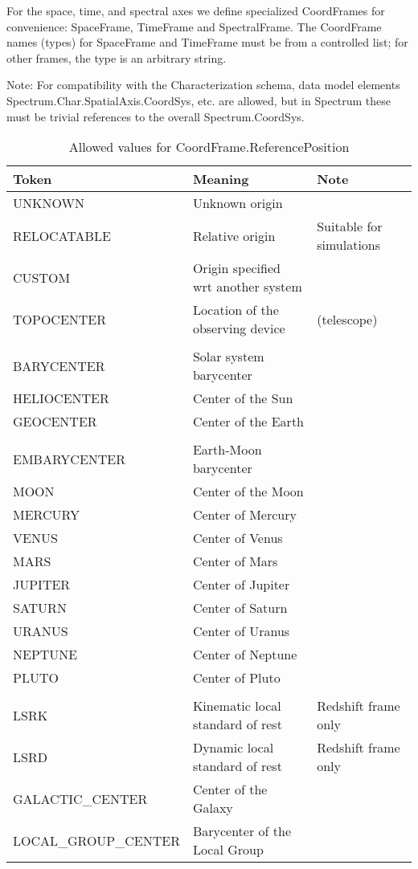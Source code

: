 \documentclass[11pt]{article}
\begin{document}
For the space, time, and spectral axes we define specialized CoordFrames
for convenience: SpaceFrame, TimeFrame and SpectralFrame. The
CoordFrame names (types) for SpaceFrame and TimeFrame must be from a
controlled list; for other frames, the type is an arbitrary string.

Note: For compatibility with the Characterization schema, data model
elements Spectrum.Char.SpatialAxis.CoordSys, etc. are allowed, but
in Spectrum these must be trivial references to the overall
Spectrum.CoordSys.


\setcounter{table}{3}

\begin{table}[h]
\small

\begin{tabular}{|lll|}
\hline
Token  &  Meaning & Note \\
\hline
UNKNOWN     &  Unknown origin&\\   %
RELOCATABLE & Relative origin& Suitable for simulations\\
CUSTOM      &  Origin specified wrt another system&\\
TOPOCENTER &  Location of the observing device &(telescope)\\
&&\\
BARYCENTER &  Solar system barycenter&\\
HELIOCENTER &  Center of the Sun&\\
GEOCENTER   &  Center of the Earth&\\
&&\\
EMBARYCENTER & Earth-Moon barycenter&\\
MOON         & Center of the Moon&\\
MERCURY      & Center of Mercury&\\
VENUS        & Center of Venus &\\
MARS & Center of Mars&\\
JUPITER& Center of Jupiter&\\
SATURN & Center of Saturn&\\
URANUS & Center of Uranus&\\
NEPTUNE & Center of Neptune&\\
PLUTO   & Center of Pluto&\\
&&\\
LSRK        & Kinematic local standard of rest& Redshift frame only\\
LSRD        & Dynamic local standard of rest& Redshift frame only\\
GALACTIC\_CENTER& Center of the Galaxy&\\
LOCAL\_GROUP\_CENTER&  Barycenter of the Local Group&\\
\hline
\end{tabular}
\caption{Allowed values for CoordFrame.ReferencePosition}

\end{table}
\end{document}
